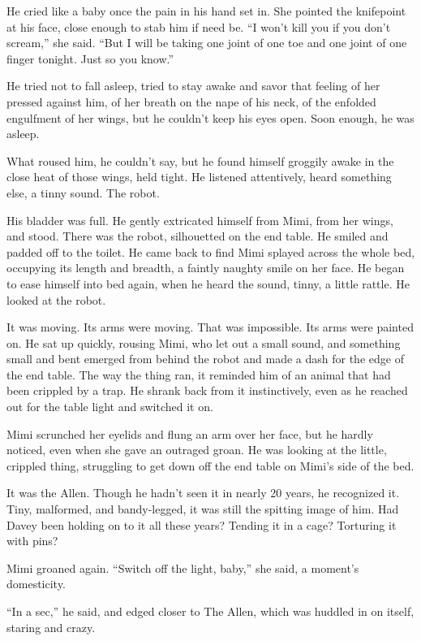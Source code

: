 He cried like a baby once the pain in his hand set in.  She pointed
the knifepoint at his face, close enough to stab him if need be.  ``I
won't kill you if you don't scream,'' she said.  ``But I will be
taking one joint of one toe and one joint of one finger tonight.  Just
so you know.''

He tried not to fall asleep, tried to stay awake and savor that
feeling of her pressed against him, of her breath on the nape of his
neck, of the enfolded engulfment of her wings, but he couldn't keep
his eyes open.  Soon enough, he was asleep.

What roused him, he couldn't say, but he found himself groggily awake
in the close heat of those wings, held tight.  He listened
attentively, heard something else, a tinny sound.  The robot.

His bladder was full.  He gently extricated himself from Mimi, from
her wings, and stood.  There was the robot, silhouetted on the end
table.  He smiled and padded off to the toilet.  He came back to find
Mimi splayed across the whole bed, occupying its length and breadth, a
faintly naughty smile on her face.  He began to ease himself into bed
again, when he heard the sound, tinny, a little rattle.  He looked at
the robot.

It was moving.  Its arms were moving.  That was impossible.  Its arms
were painted on.  He sat up quickly, rousing Mimi, who let out a small
sound, and something small and bent emerged from behind the robot and
made a dash for the edge of the end table.  The way the thing ran, it
reminded him of an animal that had been crippled by a trap.  He shrank
back from it instinctively, even as he reached out for the table light
and switched it on.

Mimi scrunched her eyelids and flung an arm over her face, but he
hardly noticed, even when she gave an outraged groan.  He was looking
at the little, crippled thing, struggling to get down off the end
table on Mimi's side of the bed.

It was the Allen.  Though he hadn't seen it in nearly 20 years, he
recognized it.  Tiny, malformed, and bandy-legged, it was still the
spitting image of him.  Had Davey been holding on to it all these
years?  Tending it in a cage?  Torturing it with pins?

Mimi groaned again.  ``Switch off the light, baby,'' she said, a
moment's domesticity.

``In a sec,'' he said, and edged closer to The Allen, which was
huddled in on itself, staring and crazy.

